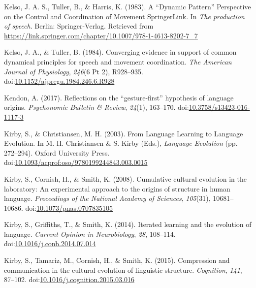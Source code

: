 \documentclass[
  man, noextraspace,floatsintext]{apa6}
\newlength{\cslhangindent}
\newenvironment{cslreferences}%
  {\setlength{\parindent}{0pt}%
  \everypar{\setlength{\hangindent}{\cslhangindent}}\ignorespaces}%
  {\par}
\begin{document}
\begin{cslreferences}
\leavevmode\hypertarget{ref-kelsoDynamicPatternPerspective1983}{}%
Kelso, J. A. S., Tuller, B., \& Harris, K. (1983). A ``Dynamic Pattern'' Perspective on the Control and Coordination of Movement \textbar{} SpringerLink. In \emph{The production of speech}. Berlin: Springer-Verlag. Retrieved from \url{https://link.springer.com/chapter/10.1007/978-1-4613-8202-7_7}

\leavevmode\hypertarget{ref-kelsoConvergingEvidenceSupport1984}{}%
Kelso, J. A., \& Tuller, B. (1984). Converging evidence in support of common dynamical principles for speech and movement coordination. \emph{The American Journal of Physiology}, \emph{246}(6 Pt 2), R928--935. doi:\href{https://doi.org/10.1152/ajpregu.1984.246.6.R928}{10.1152/ajpregu.1984.246.6.R928}

\leavevmode\hypertarget{ref-kendonReflectionsGesturefirstHypothesis2017}{}%
Kendon, A. (2017). Reflections on the ``gesture-first'' hypothesis of language origins. \emph{Psychonomic Bulletin \& Review}, \emph{24}(1), 163--170. doi:\href{https://doi.org/10.3758/s13423-016-1117-3}{10.3758/s13423-016-1117-3}

\leavevmode\hypertarget{ref-kirbyLanguageLearningLanguage2003}{}%
Kirby, S., \& Christiansen, M. H. (2003). From Language Learning to Language Evolution. In M. H. Christiansen \& S. Kirby (Eds.), \emph{Language Evolution} (pp. 272--294). Oxford University Press. doi:\href{https://doi.org/10.1093/acprof:oso/9780199244843.003.0015}{10.1093/acprof:oso/9780199244843.003.0015}

\leavevmode\hypertarget{ref-kirbyCumulativeCulturalEvolution2008}{}%
Kirby, S., Cornish, H., \& Smith, K. (2008). Cumulative cultural evolution in the laboratory: An experimental approach to the origins of structure in human language. \emph{Proceedings of the National Academy of Sciences}, \emph{105}(31), 10681--10686. doi:\href{https://doi.org/10.1073/pnas.0707835105}{10.1073/pnas.0707835105}

\leavevmode\hypertarget{ref-kirbyIteratedLearningEvolution2014}{}%
Kirby, S., Griffiths, T., \& Smith, K. (2014). Iterated learning and the evolution of language. \emph{Current Opinion in Neurobiology}, \emph{28}, 108--114. doi:\href{https://doi.org/10.1016/j.conb.2014.07.014}{10.1016/j.conb.2014.07.014}

\leavevmode\hypertarget{ref-kirbyCompressionCommunicationCultural2015a}{}%
Kirby, S., Tamariz, M., Cornish, H., \& Smith, K. (2015). Compression and communication in the cultural evolution of linguistic structure. \emph{Cognition}, \emph{141}, 87--102. doi:\href{https://doi.org/10.1016/j.cognition.2015.03.016}{10.1016/j.cognition.2015.03.016}


\end{cslreferences}
\end{document}
